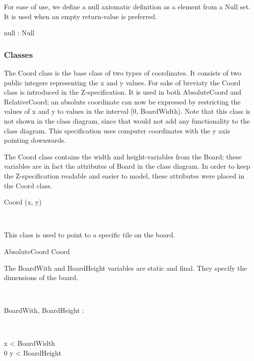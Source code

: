 \documentclass[12pt]{article}
\begin{document}
For ease of use, we define a null axiomatic definition as a element from a Null set. It is used when an empty return-value is preferred.
\begin{zed}
[Null]
\end{zed}
\begin{axdef}
null : Null
\end{axdef}

\subsubsection{Classes}

The Coord class is the base class of two types of coordinates. It consists of two public integers representing the x and y values.
For sake of breviaty the Coord class is introduced in the Z-specification. It is used in both AbsoluteCoord and RelativeCoord; an absolute coordinate can now be expressed by restricting the values of x and y to values in the interval [0, BoardWidth). Note that this class is not shown in the class diagram, since that would not add any functionality to the class diagram. This specification uses computer coordinates with the y axis pointing downwards.

The Coord class contains the width and height-variables from the Board; these variables are in fact the attributes of Board in the class diagram. In order to keep the Z-specification readable and easier to model, these attributes were placed in the Coord class.
\begin{class}{Coord}
\upharpoonright (x, y) \\
 \\
\end{class}

This class is used to point to a specific tile on the board.
\begin{class}{AbsoluteCoord}
Coord \\
\begin{zpar}
The BoardWith and BoardHeight variables are static and final. They specify the dimensions of the board.
\end{zpar} \\
\begin{axdef}
BoardWith, BoardHeight : \nat
\end{axdef} \\
\begin{state}
 \leq x < BoardWidth \\
0 \leq y < BoardHeight
\end{state}
\end{class}
\end{document}
